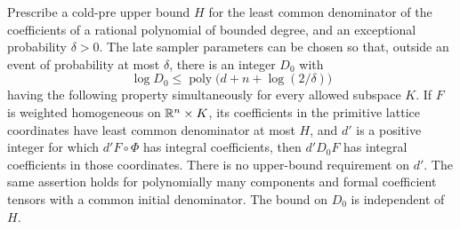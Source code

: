 \begin{lemma}
\label{ap:major:denominator}
Prescribe a cold-pre upper bound $H$ for the least common denominator
of the coefficients of a rational polynomial of bounded degree, and
an exceptional probability $\delta>0$.  The late sampler parameters
can be chosen so that, outside an event of probability at most
$\delta$, there is an integer $D_0$ with
\[
          \log D_0\le
          \operatorname{poly}\bigl(d+n+\log(2/\delta)\bigr)
\]
having the following property simultaneously for every allowed
subspace $K$.  If $F$ is weighted homogeneous on $\mathbb R^n\times K$, its
coefficients in the primitive lattice coordinates have least common
denominator at most $H$, and $d'$ is a positive integer for which
$d'F\circ\Phi$ has integral coefficients,
then $d'D_0F$ has integral coefficients in those coordinates.
There is no upper-bound requirement on $d'$.  The same assertion
holds for polynomially many components and formal coefficient
tensors with a common initial denominator.  The bound on $D_0$ is
independent of $H$.
\end{lemma}

